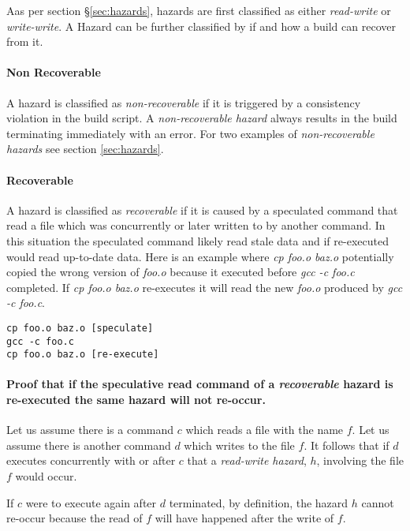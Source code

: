 Aas per section \S\ref{sec:hazards}, hazards are first classified as either \emph{read-write} or \emph{write-write}.  A Hazard can be further classified by if and how a build can recover from it.

\paragraph{Non Recoverable}
A hazard is classified as \emph{non-recoverable} if it is triggered by a consistency violation in the build script.  A \emph{non-recoverable hazard} always results in the build terminating immediately with an error.  For two examples of \emph{non-recoverable hazards} see section \ref{sec:hazards}.

\paragraph{Recoverable}
A hazard is classified as \emph{recoverable} if it is caused by a speculated command that read a file which was concurrently or later written to by another command.  In this situation the speculated command likely read stale data and if re-executed would read up-to-date data.  Here is an example where \emph{cp foo.o baz.o} potentially copied the wrong version of \emph{foo.o} because it executed before \emph{gcc -c foo.c} completed.  If \emph{cp foo.o baz.o} re-executes it will read the new \emph{foo.o} produced by \emph{gcc -c foo.c}.

\begin{verbatim}
cp foo.o baz.o [speculate]
gcc -c foo.c
cp foo.o baz.o [re-execute]
\end{verbatim}

\paragraph{Proof that if the speculative read command of a \emph{recoverable} hazard is re-executed the same hazard will not re-occur.}

Let us assume there is a command $c$ which reads a file with the name $f$.  Let us assume there
is another command $d$ which writes to the file $f$.  It follows that if $d$ executes concurrently with or after $c$ that a \emph{read-write hazard}, $h$, involving the file $f$ would occur.

If $c$ were to execute again after $d$ terminated, by definition, the hazard $h$ cannot re-occur because the read of $f$ will have happened after the write of $f$.

